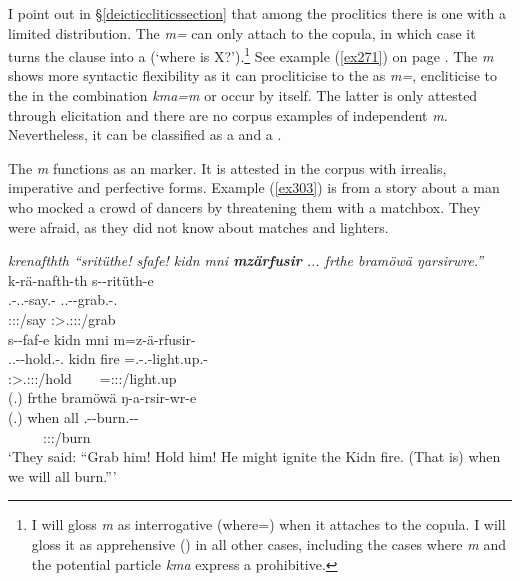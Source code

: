 I point out in {\S}\ref{deicticcliticssection} that among the  proclitics there is one with a limited distribution. The \emph{m=}  can only attach to the copula, in which case it turns the clause into a  (`where is X?').\footnote{I will gloss \emph{m} as interrogative (where=) when it attaches to the copula. I will gloss it as apprehensive (\Appr) in all other cases, including the cases where \emph{m} and the potential particle \emph{kma} express a prohibitive.} See example (\ref{ex271}) on page \pageref{ex271}. The \emph{m}  shows more syntactic flexibility as it can procliticise to the  as \emph{m=}, encliticise to the   in the combination \emph{kma=m} or occur by itself. The latter is only attested through elicitation and there are no corpus examples of independent \emph{m}. Nevertheless, it can be classified as a  and a .

The  \emph{m} functions as an  marker. It is attested in the corpus with irrealis, imperative and perfective forms. Example (\ref{ex303}) is from a story about a man who mocked a crowd of dancers by threatening them with a matchbox. They were afraid, as they did not know about matches and lighters.

\begin{exe}
	\ex \emph{krenafthth ``sritüthe! sfafe! kidn mni \textbf{mzärfusir} ... frthe bramöwä ŋarsirwre.''}\\
	\glll k-rä-nafth-th s-\Zero{}-ritüth-e\\
	\M.\Bet-\Irr.\Vc.\Ndu-say.\Rs-\Stnsg{} \Tsg.\Masc.\Bet-\Du-grab.\Rs-\Stnsg{}.{\Imp}\\
	{\footnotesize \Stpl:\Sbj:\Irr:\Pfv/say} {\footnotesize \Sdu:\Sbj>\Tsg.\Masc:\Obj:\Imp:\Pfv/grab}\\
	\sn
	\glll s-\Zero{}-faf-e kidn mni m=z-ä-rfusir-\Zero{}\\
	\Tsg.\Masc.\Bet-\Du-hold.\Rs-\Stnsg{}.{\Imp} kidn fire \Appr=\M.\Gam-\Vc.\Ndu-light.up.{\Rs}-\Stsg{}\\
	{\footnotesize \Sdu:\Sbj>\Tsg.\Masc:\Obj:\Imp:\Pfv/hold} ~ ~ {\footnotesize \Appr=\Stsg:\Sbj:\Rpst:\Pfv/light.up}\\
	\sn
	\glll (.) frthe bramöwä ŋ-a-rsir-wr-e\\
	(.) when all \M.\Alph-\Vc-burn.\Ext-\Ndu-{\Fnsg}\\
	 ~ ~ ~ {\footnotesize \Fpl:\Sbj:\Nonpast:\Ipfv/burn}\\
	\trans `They said: ``Grab him! Hold him! He might ignite the Kidn fire. (That is) when we will all burn.''' 
	\label{ex303}
\end{exe}


